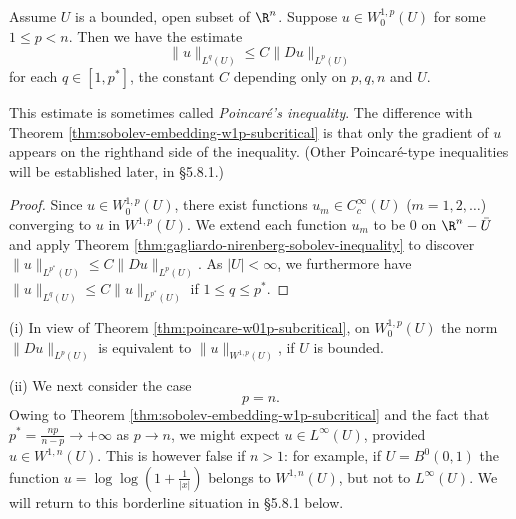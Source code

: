 \begin{theorem}
\label{thm:poincare-w01p-subcritical}
Assume $U$ is a bounded, open subset of $\R^n$. Suppose $u \in W_0^{1,p}(U)$ for some $1 \le p < n$. Then we have the estimate
$$\|u\|_{L^q(U)} \le C\|Du\|_{L^p(U)}$$
for each $q \in [1, p^*]$, the constant $C$ depending only on $p, q, n$ and $U$.
\end{theorem}

\begin{remark}
\label{rem:poincare-w01p-terminology}
This estimate is sometimes called \textit{Poincaré's inequality}. The difference with Theorem \ref{thm:sobolev-embedding-w1p-subcritical} is that only the gradient of $u$ appears on the righthand side of the inequality. (Other Poincaré-type inequalities will be established later, in §5.8.1.)
\end{remark}

\begin{proof}
Since $u \in W_0^{1,p}(U)$, there exist functions $u_m \in C_c^\infty(U)$ ($m = 1,2,\ldots$) converging to $u$ in $W^{1,p}(U)$. We extend each function $u_m$ to be 0 on $\R^n - \bar{U}$ and apply Theorem \ref{thm:gagliardo-nirenberg-sobolev-inequality} to discover $\|u\|_{L^{p^*}(U)} \le C\|Du\|_{L^p(U)}$. As $|U| < \infty$, we furthermore have $\|u\|_{L^q(U)} \le C\|u\|_{L^{p^*}(U)}$ if $1 \le q \le p^*$.
\end{proof}

\begin{remark}[Equivalent norm on $W_0^{1,p}$; the borderline case $p=n$]
\label{rem:borderline-case-p-equals-n}
(i) In view of Theorem \ref{thm:poincare-w01p-subcritical}, on $W_0^{1,p}(U)$ the norm $\|Du\|_{L^p(U)}$ is equivalent to $\|u\|_{W^{1,p}(U)}$, if $U$ is bounded.

(ii) We next consider the case
$$p = n.$$
Owing to Theorem \ref{thm:sobolev-embedding-w1p-subcritical} and the fact that $p^* = \frac{np}{n-p} \to +\infty$ as $p \to n$, we might expect $u \in L^\infty(U)$, provided $u \in W^{1,n}(U)$. This is however false if $n > 1$: for example, if $U = B^0(0,1)$ the function $u = \log\log\left(1 + \frac{1}{|x|}\right)$ belongs to $W^{1,n}(U)$, but not to $L^\infty(U)$. We will return to this borderline situation in §5.8.1 below.
\end{remark}

